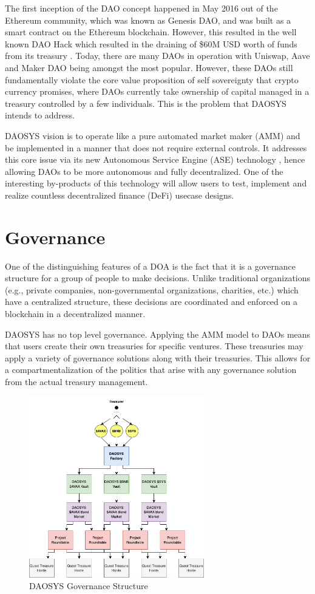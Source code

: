 \documentclass[journal,twocolumn,12pt]{ieeesyscoin}
\begin{document}
The first inception of the DAO concept happened in May 2016 out of the Ethereum community, which was known as Genesis DAO, and was built as a smart contract on the Ethereum blockchain. However, this resulted in the well known DAO Hack which resulted in the draining of \$60M USD worth of funds from its treasury \cite{Sie22}. Today, there are many DAOs in operation with Uniswap, Aave and Maker DAO being amongst the most popular. However, these DAOs still fundamentally violate the core value proposition of self sovereignty that crypto currency promises, where DAOs currently take ownership of capital managed in a treasury controlled by a few individuals. This is the problem that DAOSYS intends to address.

DAOSYS vision is to operate like a pure automated market maker (AMM) and be implemented in a manner that does not require external controls. It addresses this core issue via its new Autonomous Service Engine (ASE) technology \cite{Sys22}, hence allowing DAOs to be more autonomous and fully decentralized. One of the interesting by-products of this technology will allow users to test, implement and realize countless decentralized finance (DeFi) usecase designs.

\section{Governance}
\label{sec:governance}

One of the distinguishing features of a DOA is the fact that it is a governance structure for a group of people to make decisions. Unlike traditional organizations (e.g., private companies, non-governmental organizations, charities, etc.) which have a centralized structure, these decisions are coordinated and enforced on a blockchain in a decentralized manner. 

DAOSYS has no top level governance. Applying the AMM model to DAOs means that users create their own treasuries for specific ventures. These treasuries may apply a variety of governance solutions along with their treasuries. This allows for a compartmentalization of the politics that arise with any governance solution from the actual treasury management.

\begin{figure}[h!]
\includegraphics[width=3in]{img/governance.png}
\caption{DAOSYS Governance Structure} 
\label{fig:current_vs_zdag}
\end{figure} 
\end{document}
